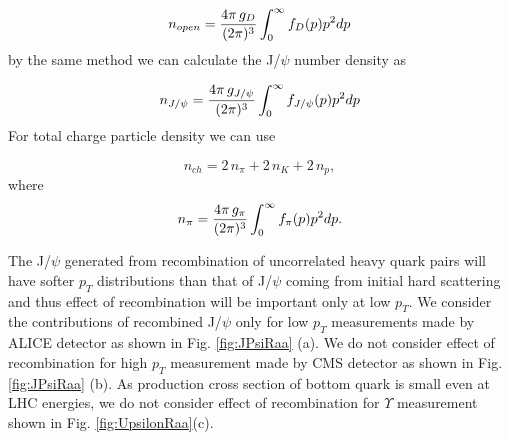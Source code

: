 \documentclass[aps,prc,preprint,superscriptaddress,showpacs,showkeys]{revtex4-1}
\begin{document}
\begin{equation}
n_{open} = {4\pi \,g_{D} \over (2\pi)^{3}} \int_{0}^{\infty} f_{D}(p)p^{2}dp
\end{equation}
by the same method we can calculate the J/$\psi$ number density as

\begin{equation}
n_{J/\psi} = {4\pi \,g_{J/\psi} \over (2\pi)^{3}} \int_{0}^{\infty} f_{J/\psi}(p)p^{2}dp 
\end{equation}
 For total charge particle density we can use 

\begin{equation}
n_{ch} = 2 \,n_{\pi} + 2\, n_{K} + 2\, n_{p},
\end{equation}
where
\begin{equation}
n_{\pi} = {4\pi \,g_{\pi} \over (2\pi)^{3}} \int_{0}^{\infty} f_{\pi}(p)p^{2}dp.
\end{equation}

 The J/$\psi$ generated from recombination of uncorrelated heavy quark pairs will have 
softer $p_{T}$ distributions than that of J/$\psi$ coming from initial hard scattering and thus 
effect of recombination will be important only at low $p_T$. We consider the contributions of recombined J/$\psi$
only for low $p_{T}$ measurements made by ALICE detector as shown in Fig. \ref{fig:JPsiRaa} (a).     
 We do not consider effect of recombination for high $p_{T}$ measurement made by CMS detector \cite{CMSUpsilon,CMSJPsi} 
as shown in Fig. \ref{fig:JPsiRaa} (b). As production cross section of bottom quark is small even at LHC energies,
we do not consider effect of recombination for $\Upsilon$ measurement shown in Fig. \ref{fig:UpsilonRaa}(c).
\end{document}
